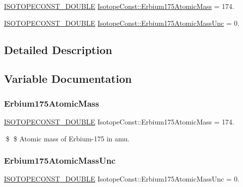 \begin{DoxyCompactItemize}
\item 
\mbox{\hyperlink{group___isotope_const-_macros_ga8f45a7272ce02c0b4c65c44636ed719a}{I\+S\+O\+T\+O\+P\+E\+C\+O\+N\+S\+T\+\_\+\+D\+O\+U\+B\+LE}} \mbox{\hyperlink{group___isotope_const-_erbium-_er175_ga1d41ea5ace22bf5dfe80dfa51fb9a545}{Isotope\+Const\+::\+Erbium175\+Atomic\+Mass}} = 174.
\item 
\mbox{\hyperlink{group___isotope_const-_macros_ga8f45a7272ce02c0b4c65c44636ed719a}{I\+S\+O\+T\+O\+P\+E\+C\+O\+N\+S\+T\+\_\+\+D\+O\+U\+B\+LE}} \mbox{\hyperlink{group___isotope_const-_erbium-_er175_ga429ce7f3ac3bad29e9c31bab2fe4d6bc}{Isotope\+Const\+::\+Erbium175\+Atomic\+Mass\+Unc}} = 0.
\end{DoxyCompactItemize}


\subsection{Detailed Description}


\subsection{Variable Documentation}
\mbox{\label{group___isotope_const-_erbium-_er175_ga1d41ea5ace22bf5dfe80dfa51fb9a545}} 
\subsubsection{\texorpdfstring{Erbium175\+Atomic\+Mass}{Erbium175AtomicMass}}
{\footnotesize\ttfamily \mbox{\hyperlink{group___isotope_const-_macros_ga8f45a7272ce02c0b4c65c44636ed719a}{I\+S\+O\+T\+O\+P\+E\+C\+O\+N\+S\+T\+\_\+\+D\+O\+U\+B\+LE}} Isotope\+Const\+::\+Erbium175\+Atomic\+Mass = 174.}

\$ \$ Atomic mass of Erbium-\/175 in amu. \mbox{\label{group___isotope_const-_erbium-_er175_ga429ce7f3ac3bad29e9c31bab2fe4d6bc}} 
\subsubsection{\texorpdfstring{Erbium175\+Atomic\+Mass\+Unc}{Erbium175AtomicMassUnc}}
{\footnotesize\ttfamily \mbox{\hyperlink{group___isotope_const-_macros_ga8f45a7272ce02c0b4c65c44636ed719a}{I\+S\+O\+T\+O\+P\+E\+C\+O\+N\+S\+T\+\_\+\+D\+O\+U\+B\+LE}} Isotope\+Const\+::\+Erbium175\+Atomic\+Mass\+Unc = 0.}

